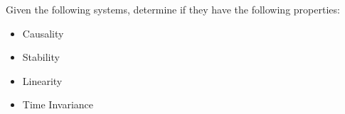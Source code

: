 
Given the following systems, determine if they have the following properties:
\begin{itemize}
  \item Causality
  \item Stability
  \item Linearity
  \item Time Invariance
\end{itemize}
